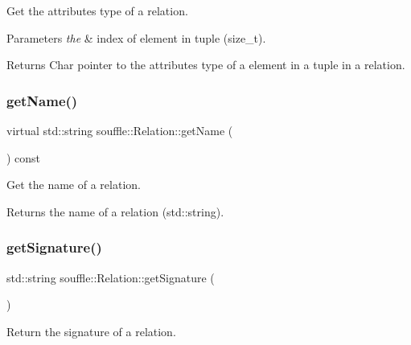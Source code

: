 Get the attributes type of a relation. 
\begin{DoxyParams}{Parameters}
{\em the} & index of element in tuple (size\+\_\+t). \\
\hline
\end{DoxyParams}
\begin{DoxyReturn}{Returns}
Char pointer to the attributes type of a element in a tuple in a relation. 
\end{DoxyReturn}
\mbox{\label{classsouffle_1_1_relation_a36b722447994202be331f76186abfa0a}} 
\subsubsection{\texorpdfstring{get\+Name()}{getName()}}
{\footnotesize\ttfamily virtual std\+::string souffle\+::\+Relation\+::get\+Name (\begin{DoxyParamCaption}{ }\end{DoxyParamCaption}) const\hspace{0.3cm}{\ttfamily [pure virtual]}}

Get the name of a relation. \begin{DoxyReturn}{Returns}
the name of a relation (std\+::string). 
\end{DoxyReturn}
\mbox{\label{classsouffle_1_1_relation_aba2d25b446b972b4a607bb8d2ddc6dac}} 
\subsubsection{\texorpdfstring{get\+Signature()}{getSignature()}}
{\footnotesize\ttfamily std\+::string souffle\+::\+Relation\+::get\+Signature (\begin{DoxyParamCaption}{ }\end{DoxyParamCaption})\hspace{0.3cm}{\ttfamily [inline]}}

Return the signature of a relation. \mbox{\label{classsouffle_1_1_relation_aafe66b5dd0bb775432f884bc47741a52}} 
